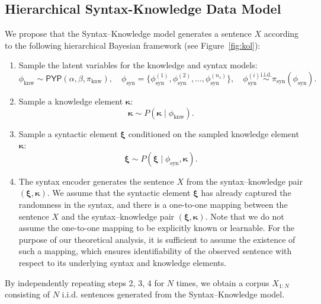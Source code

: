 \documentclass[11pt]{article}
\theoremstyle{plain}
\theoremstyle{definition}
\newcommand{\numsyntax}{n_s}
\newcommand{\knwModel}{\phi_{\text{knw}}}
\newcommand{\synModel}{\phi_{\text{syn}}}
\newcommand{\PYP}{\mathsf{PYP}}
\newcommand{\basemeasure}{\pi_{\text{knw}}}
\newcommand{\synprior}{\pi_{\text{syn}}}
\newcommand{\Knwelem}{\boldsymbol{\kappa}}
\newcommand{\Synelem}{\boldsymbol{\xi}}
\begin{document}
\subsection{Hierarchical Syntax-Knowledge Data Model}
We propose that the Syntax–Knowledge model generates a sentence \( X \) according to the following hierarchical Bayesian framework
(see Figure~\ref{fig:kol}):
\begin{enumerate}
\item Sample the latent variables for the knowledge and syntax models:
    \[
    \knwModel \sim \PYP(\alpha,\beta,\basemeasure), \quad 
    \synModel = \{ \synModel^{(1)}, \synModel^{(2)}, \dots, \synModel^{(\numsyntax)} \}, \quad 
    \synModel^{(i)} \overset{\text{i.i.d.}}{\sim} \synprior(\synModel).
    \]
    
    \item Sample a knowledge element $\Knwelem$:
    \[
    \Knwelem \sim P(\Knwelem \mid \knwModel).
    \]
    
    \item Sample a syntactic element $\Synelem$ conditioned on the sampled knowledge element $\Knwelem$:
    \[
    \Synelem \sim P(\Synelem \mid \synModel, \Knwelem).
    \]
    
    \item The syntax encoder generates the sentence \( X \) from the syntax–knowledge pair \( (\Synelem, \Knwelem) \). 
    We assume that the syntactic element $\Synelem$ has already captured
    the randomness in the syntax, and there is a one-to-one mapping between
    the sentence \( X \) and the syntax–knowledge pair \( (\Synelem, \Knwelem) \).
    Note that we do not assume the one-to-one mapping to be explicitly known or learnable. For the purpose of our theoretical analysis, it is sufficient to assume the existence of such a mapping, which ensures identifiability of the observed sentence with respect to its underlying syntax and knowledge elements.
\end{enumerate}
     

By independently repeating steps 2, 3, 4 for \( N \) times, we obtain a corpus \( X_{1:N} \) consisting of $N$ i.i.d. sentences generated from the Syntax–Knowledge model.
\end{document}
